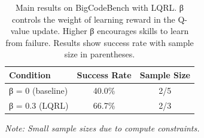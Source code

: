 
\begin{table}[t]
\centering
\caption{Main results on BigCodeBench with LQRL. β controls the weight of learning reward
in the Q-value update. Higher β encourages skills to learn from failure. Results show
success rate with sample size in parentheses.}
\label{tab:main_results}
\begin{tabular}{lcc}
\toprule
\textbf{Condition} & \textbf{Success Rate} & \textbf{Sample Size} \\
\midrule
β = 0 (baseline) & 40.0\% & 2/5 \\
β = 0.3 (LQRL) & 66.7\% & 2/3 \\
\bottomrule
\end{tabular}
\vspace{-0.3em}
\footnotesize{\textit{Note: Small sample sizes due to compute constraints.}}
\end{table}
